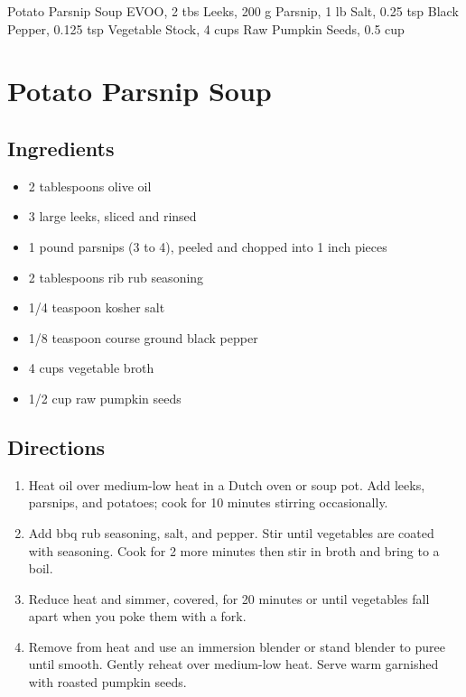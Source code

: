 Potato Parsnip Soup
  EVOO, 2 tbs
  Leeks, 200 g
  Parsnip, 1 lb
  Salt, 0.25 tsp
  Black Pepper, 0.125 tsp
  Vegetable Stock, 4 cups
  Raw Pumpkin Seeds, 0.5 cup

\section{ Potato Parsnip Soup }

\subsection{ Ingredients }

\begin{itemize}
  \item 2 tablespoons olive oil
  \item 3 large leeks, sliced and rinsed
  \item 1 pound parsnips (3 to 4), peeled and chopped into 1 inch pieces
  \item 2 tablespoons rib rub seasoning
  \item 1/4 teaspoon kosher salt
  \item 1/8 teaspoon course ground black pepper
  \item 4 cups vegetable broth
  \item 1/2 cup raw pumpkin seeds
\end{itemize}

\subsection{ Directions }

\begin{enumerate}
  \item Heat oil over medium-low heat in a Dutch oven or soup pot. Add leeks, parsnips, and potatoes; cook for 10 minutes stirring occasionally. 
  \item Add bbq rub seasoning, salt, and pepper. Stir until vegetables are coated with seasoning. Cook for 2 more minutes then stir in broth and bring to a boil. 
  \item Reduce heat and simmer, covered, for 20 minutes or until vegetables fall apart when you poke them with a fork. 
  \item Remove from heat and use an immersion blender or stand blender to puree until smooth. Gently reheat over medium-low heat. Serve warm garnished with roasted pumpkin seeds. 
\end{enumerate}
